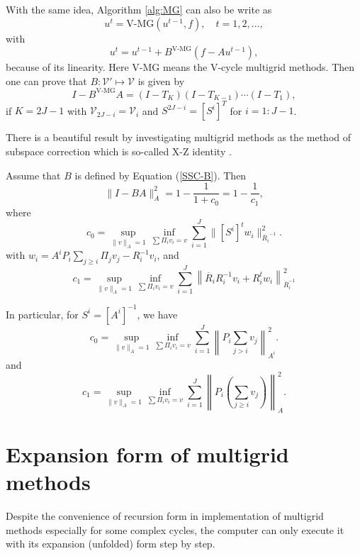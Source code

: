 With the same idea, Algorithm \ref{alg:MG} can also be write as
$$
u^t=\text{V-MG}(u^{t-1},f), \quad t=1,2,\ldots,
$$
with
$$
u^{t} = u^{t-1} + B^{\text{V-MG}}(f - Au^{t-1}),
$$
because of its linearity. Here $\text{V-MG}$ means the V-cycle multigrid
methods.
Then one can prove that $B: \mathcal V' \mapsto \mathcal V$ is given by 
\begin{equation}
I-B^{\text{V-MG}}A= (I-T_K)(I-T_{K-1})\cdots(I-T_1),
\end{equation}
if $K = 2J-1$ with $\mathcal V_{2J-i} = \mathcal V_i$  and
$S^{2J-i} = [S^i]^T$ for $i = 1:J-1$.

There is a beautiful result by investigating multigrid methods
as the method of subspace correction which is so-called 
X-Z identity \cite{xu2002method}. 
\begin{theorem}[X-Z Identity($c_0$)]\label{th:xzidentityc0}
	Assume that $B$ is defined by Equation (\ref{SSC-B}). Then 
	\begin{equation}\label{eq:xzidentityc0}
	\|I-BA\|_A^2=1-\frac{1}{1+c_0}=1-\frac{1}{c_1},
	\end{equation}
	where
	\begin{equation}\label{eq:xzc0}
	c_0=\sup_{\|v\|_A=1}\inf_{\sum
		\Pi_i v_i=v}\sum_{i=1}^J\|[S^i]^tw_i\|_{{\overline R_i}^{-1}}^{2}.
	\end{equation}
	with $w_i=A^iP_i\sum_{j\geq i} \Pi_j v_j-R_i^{-1}v_i$, 
	and
	\begin{equation}\label{eq:xzc1}
	c_1=\sup_{\|v\|_A=1}\inf_{\sum \Pi_i v_i=v}\sum_{i=1}^J
	\left\|\overline R_i R_i^{-1} v_i +R_i^t w_i\right\|_{\overline R_i^{-1}}^2
	\end{equation}
	
	In particular, for $S^i=[A^i]^{-1}$, we have 
	\begin{equation}
	\label{eq:c0p}
	c_0=\sup_{\|v\|_A=1}\inf_{\sum \Pi_i v_i=v}\sum_{i=1}^J\left\| P_i\sum_{j> i}v_j\right\|_{A^i}^{2}.
	\end{equation}
	and
	\begin{equation}\label{eq:c1p}
	c_1=\sup_{\|v\|_A=1}\inf_{\sum \Pi_i v_i=v}\sum_{i=1}^J
	\left\|P_i\left(\sum_{j\geq i}v_j\right)\right\|_{A}^2.
	\end{equation}
\end{theorem}



\section{Expansion form of multigrid methods}\label{sec:mg_expansion}
Despite the convenience of recursion form in implementation
of multigrid methods especially for some complex cycles, the computer can
only execute it with its expansion (unfolded) form step by step. 

